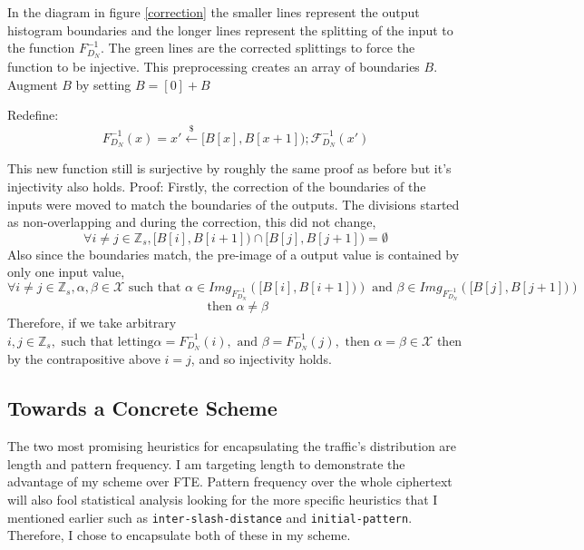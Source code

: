 \documentclass[ %
                    author={Samuel Russell},
                supervisor={Prof. Bogdan Warinschi},
                    degree={MEng},
                     title={Innocuous Ciphertexts},
                  subtitle={The DE-CENSOR Scheme},
                      type={research},
                      year={2018} ]{dissertation}
\begin{document}
In the diagram in figure \ref{correction} the smaller lines represent the output histogram boundaries and the longer lines represent the splitting of the input to the function $F^{-1}_{D_N}$.
The green lines are the corrected splittings to force the function to be injective. This preprocessing creates an array of boundaries $B$. Augment $B$ by setting $B = [0] + B$

Redefine:
$$F^{-1}_{D_N}(x) = x' \xleftarrow{\$} [B[x], B[x+1]); \mathcal{F}^{-1}_{D_N}(x')$$

This new function still is surjective by roughly the same proof as before but it's injectivity also holds.
Proof:
Firstly, the correction of the boundaries of the inputs were moved to match the boundaries of the outputs.
The divisions started as non-overlapping and during the correction, this did not change, 
$$\forall i \neq j \in \mathbb{Z}_s, \big[ B[i],B[i+1] \big) \cap \big[ B[j],B[j+1] \big) = \emptyset$$
Also since the boundaries match, the pre-image of a output value is contained by only one input value,
$$ \forall i \neq j \in \mathbb{Z}_s, \alpha,\beta \in \mathcal{X} \text{ such that } \alpha \in Img_{F^{-1}_{D_N}}(\big[ B[i],B[i+1] \big)) \text{ and } \beta \in Img_{F^{-1}_{D_N}}(\big[ B[j],B[j+1] \big))$$
$$\text{ then } \alpha \neq \beta$$
Therefore, if we take arbitrary $i, j \in \mathbb{Z}_s, \text{ such that letting} \alpha = F^{-1}_{D_N}(i), \text{ and } \beta = F^{-1}_{D_N}(j), \text{ then } \alpha = \beta \in \mathcal{X}$ then by the contrapositive above $i=j$, and so injectivity holds.

\subsection{Towards a Concrete Scheme}

The two most promising heuristics for encapsulating the traffic's distribution are length and pattern frequency.
I am targeting length to demonstrate the advantage of my scheme over FTE. Pattern frequency over the whole ciphertext will also fool statistical analysis looking for the more specific heuristics that I mentioned earlier such as \texttt{inter-slash-distance} and \texttt{initial-pattern}.
Therefore, I chose to encapsulate both of these in my scheme. 
\end{document}
